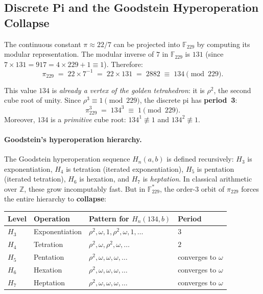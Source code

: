 \subsection{Discrete Pi and the Goodstein Hyperoperation Collapse}
\label{sec:pi_hyperops}

The continuous constant $\pi \approx 22/7$ can be projected into $\mathbb{F}_{229}$ by computing its modular representation. The modular inverse of $7$ in $\mathbb{F}_{229}$ is $131$ (since $7 \times 131 = 917 = 4 \times 229 + 1 \equiv 1$). Therefore:
\[
\pi_{229} \;=\; 22 \times 7^{-1} \;=\; 22 \times 131 \;=\; 2882 \;\equiv\; 134 \pmod{229}.
\]

This value $134$ is \emph{already a vertex of the golden tetrahedron}: it is $\rho^2$, the second cube root of unity. Since $\rho^3 \equiv 1 \pmod{229}$, the discrete pi has \textbf{period~3}:
\[
\pi_{229}^3 \;=\; 134^3 \;\equiv\; 1 \pmod{229}.
\]
Moreover, $134$ is a \emph{primitive} cube root: $134^1 \not\equiv 1$ and $134^2 \not\equiv 1$.

\paragraph{Goodstein's hyperoperation hierarchy.}
The Goodstein hyperoperation sequence $H_n(a, b)$ is defined recursively: $H_3$ is exponentiation, $H_4$ is tetration (iterated exponentiation), $H_5$ is pentation (iterated tetration), $H_6$ is hexation, and $H_7$ is \emph{heptation}. In classical arithmetic over $\mathbb{Z}$, these grow incomputably fast. But in $\mathbb{F}_{229}^*$, the order-$3$ orbit of $\pi_{229}$ forces the entire hierarchy to \textbf{collapse}:

\begin{center}
\begin{tabular}{@{}llll@{}}
\toprule
Level & Operation & Pattern for $H_n(134, b)$ & Period \\
\midrule
$H_3$ & Exponentiation & $\rho^2, \omega, 1, \rho^2, \omega, 1, \ldots$ & $3$ \\
$H_4$ & Tetration & $\rho^2, \omega, \rho^2, \omega, \ldots$ & $2$ \\
$H_5$ & Pentation & $\rho^2, \omega, \omega, \omega, \ldots$ & converges to $\omega$ \\
$H_6$ & Hexation & $\rho^2, \omega, \omega, \omega, \ldots$ & converges to $\omega$ \\
$H_7$ & Heptation & $\rho^2, \omega, \omega, \omega, \ldots$ & converges to $\omega$ \\
\bottomrule
\end{tabular}
\end{center}

